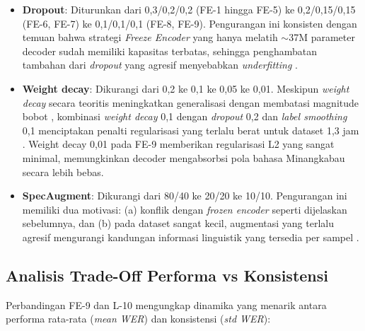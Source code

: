 \begin{itemize}
    \item \textbf{Dropout}: Diturunkan dari 0,3/0,2/0,2 (FE-1 hingga FE-5) ke 0,2/0,15/0,15 (FE-6, FE-7) ke 0,1/0,1/0,1 (FE-8, FE-9). Pengurangan ini konsisten dengan temuan bahwa strategi \textit{Freeze Encoder} yang hanya melatih $\sim$37M parameter decoder sudah memiliki kapasitas terbatas, sehingga penghambatan tambahan dari \textit{dropout} yang agresif menyebabkan \textit{underfitting} \cite{srivastava2014dropout}.

    \item \textbf{Weight decay}: Dikurangi dari 0,2 ke 0,1 ke 0,05 ke 0,01. Meskipun \textit{weight decay} secara teoritis meningkatkan generalisasi dengan membatasi magnitude bobot \cite{krogh1991regularization}, kombinasi \textit{weight decay} 0,1 dengan \textit{dropout} 0,2 dan \textit{label smoothing} 0,1 menciptakan penalti regularisasi yang terlalu berat untuk dataset 1,3 jam \cite{loshchilov2019adamw}. Weight decay 0,01 pada FE-9 memberikan regularisasi L2 yang sangat minimal, memungkinkan decoder mengabsorbsi pola bahasa Minangkabau secara lebih bebas.

    \item \textbf{SpecAugment}: Dikurangi dari 80/40 ke 20/20 ke 10/10. Pengurangan ini memiliki dua motivasi: (a) konflik dengan \textit{frozen encoder} seperti dijelaskan sebelumnya, dan (b) pada dataset sangat kecil, augmentasi yang terlalu agresif mengurangi kandungan informasi linguistik yang tersedia per sampel \cite{park2019specaugment}.
\end{itemize}

\subsection{Analisis Trade-Off Performa vs Konsistensi}

Perbandingan FE-9 dan L-10 mengungkap dinamika yang menarik antara performa rata-rata (\textit{mean WER}) dan konsistensi (\textit{std WER}):

